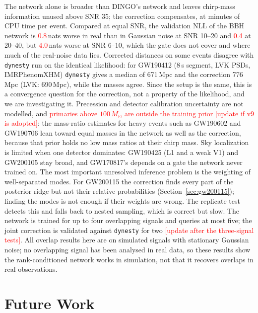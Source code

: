 \documentclass[twocolumn,linenumbers]{aastex701}
\newcommand{\pending}[1]{\textcolor{red}{#1}}
\newcommand{\msun}{M_{\odot}}
\begin{document}
The network alone is broader than DINGO's network and leaves chirp-mass
information unused above SNR 35; the correction compensates, at minutes of CPU
time per event. Compared at equal SNR, the validation NLL of the BBH network is
\pending{0.8}\,nats worse in real than in Gaussian noise at SNR 10--20 and \pending{0.4} at
20--40, but \pending{4.0}\,nats worse at SNR 6--10, which the gate does not cover and
where much of the real-noise data lies.
Corrected distances on some events disagree with \texttt{dynesty} run on the
identical likelihood: for GW190412 (8\,s segment, LVK PSDs, IMRPhenomXHM)
\texttt{dynesty} gives a median of 671\,Mpc and the correction 776\,Mpc
(LVK: 690\,Mpc), while the masses agree. Since the setup is the same, this is a
convergence question for the correction, not a property of the likelihood, and
we are investigating it. Precession and detector calibration uncertainty are not modelled, and
\pending{primaries above $100\,\msun$ are outside the training prior [update if v9 is
adopted]}: the mass-ratio estimates for heavy events such as GW190602 and GW190706
lean toward equal masses in the network as well as the correction, because that prior holds no low mass
ratios at their chirp mass. Sky localization is limited when one detector dominates: GW190425 (L1 and a weak
V1) and GW200105 stay broad, and GW170817's depends on a gate the network never trained on. The most important unresolved inference problem is the weighting of
well-separated modes. For GW200115 the correction finds every part of the
posterior ridge but not their relative probabilities
(Section~\ref{sec:gw200115}); finding the modes is not enough if their weights
are wrong. The replicate test detects this and falls back to nested sampling,
which is correct but slow. The
network is trained for up to four overlapping signals and queries at most
five; the joint correction is validated against \texttt{dynesty} for two
\pending{[update after the three-signal tests]}. All overlap results here are on simulated
signals with stationary Gaussian noise; no overlapping signal has been analysed in real
data, so these results show the rank-conditioned network works in simulation, not that it
recovers overlaps in real observations.

\section{Future Work} \label{sec:future}
\end{document}
